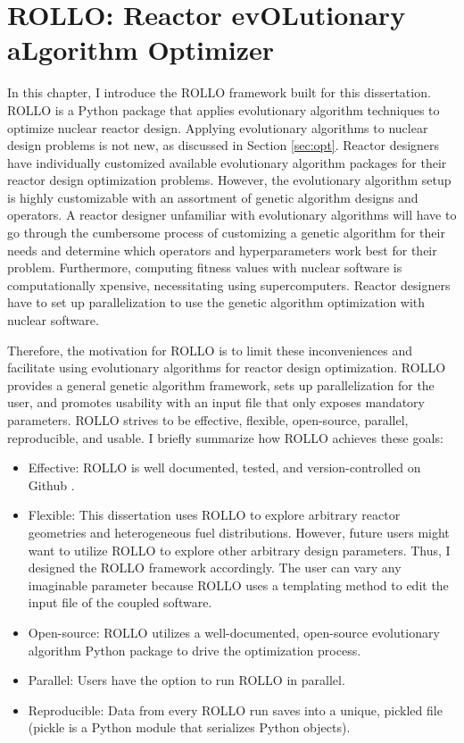 \chapter{ROLLO: Reactor evOLutionary aLgorithm Optimizer}
\label{chap:rollo}
In this chapter, I introduce the \gls{ROLLO} framework built 
for this dissertation. 
\gls{ROLLO} is a Python package that applies evolutionary algorithm 
techniques to optimize nuclear reactor design. 
Applying evolutionary algorithms to nuclear design problems is not new, as
discussed in Section \ref{sec:opt}. 
Reactor designers have individually customized available evolutionary algorithm 
packages for their reactor design optimization problems.
However, the evolutionary algorithm setup is highly customizable with
an assortment of genetic algorithm designs and operators.
A reactor designer unfamiliar with evolutionary algorithms will have
to go through the cumbersome process of customizing a genetic algorithm 
for their needs and determine which operators and hyperparameters work best for 
their problem. 
Furthermore, computing fitness values with nuclear software is computationally 
xpensive, necessitating using supercomputers. 
Reactor designers have to set up parallelization to use the genetic algorithm 
optimization with nuclear software.

Therefore, the motivation for \gls{ROLLO} is to limit these inconveniences and 
facilitate using evolutionary algorithms for reactor design optimization.
\gls{ROLLO} provides a general genetic algorithm framework, sets up 
parallelization for the user, and promotes usability with an input file 
that only exposes mandatory parameters.
\gls{ROLLO} strives to be effective, flexible, open-source, parallel, reproducible, 
and usable. 
I briefly summarize how \gls{ROLLO} achieves these goals:  
\begin{itemize}
    \item Effective: \gls{ROLLO} is well documented, tested, and 
    version-controlled on Github \cite{chee_rollo_2021}.
    \item Flexible: This dissertation uses \gls{ROLLO} to 
    explore arbitrary reactor geometries and heterogeneous fuel distributions. 
    However, future users might want to utilize \gls{ROLLO} 
    to explore other arbitrary design parameters. Thus, I designed the \gls{ROLLO}
    framework accordingly. The user can vary any imaginable parameter 
    because \gls{ROLLO} uses a templating method to edit the input file of the 
    coupled software.
    \item Open-source: \gls{ROLLO} utilizes a well-documented, open-source 
    evolutionary algorithm Python package to drive the optimization process.
    \item Parallel: Users have the option to run \gls{ROLLO} in parallel.
    \item Reproducible: Data from every \gls{ROLLO} run saves into a unique, pickled 
    file (pickle is a Python module that serializes Python objects).
\end{itemize}

